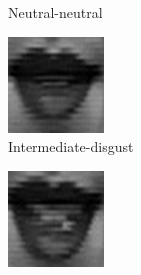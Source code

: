\begin{figure}[H]
\begin{subfigure}[b]{0.15\textwidth}
		\caption{Neutral-neutral}
		\label{fig:timeseriesHappy:c}
	\end{subfigure}
	\begin{subfigure}[b]{0.15\textwidth}
		\includegraphics[width=\textwidth]{./img/timeseriesHappy/S026_006_00000004.png}
		\caption{Intermediate-disgust}
		\label{fig:timeseriesHappy:d}
	\end{subfigure}
	\begin{subfigure}[b]{0.15\textwidth}
		\includegraphics[width=\textwidth]{./img/timeseriesHappy/S026_006_00000005.png}

\end{subfigure}
\end{figure}
